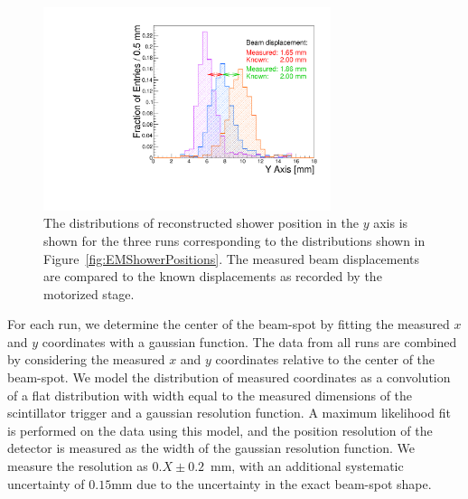 \documentclass[12pt]{article}
\begin{document}
{\begin{figure}[htbp]
	\centering
	\includegraphics[width=0.75\textwidth]{Images/centers/superimposed.pdf}
	\caption{ The distributions of reconstructed shower position in the $y$ axis is
shown for the three runs corresponding to the distributions shown in
Figure~\ref{fig:EMShowerPositions}. The measured beam displacements are
compared to the known displacements as recorded by the motorized stage. }
	\label{fig:EMShowerYPositionComparison}
\end{figure}

For each run, we determine the center of the beam-spot by fitting the
measured $x$ and $y$ coordinates with a gaussian function. The data from all runs are combined by 
considering the measured $x$ and $y$ coordinates relative to the center of the 
beam-spot. We model the distribution of measured coordinates as a convolution of 
a flat distribution with width equal to the measured dimensions of the 
scintillator trigger and a gaussian resolution function. A maximum likelihood fit is performed 
on the data using this model, and the position resolution of the detector is measured as the width 
of the gaussian resolution function. We measure the resolution as 
$0.X\pm0.2$~mm, with an additional systematic uncertainty of $0.15$mm due to the 
uncertainty in the exact beam-spot shape. 

}
\end{document}
